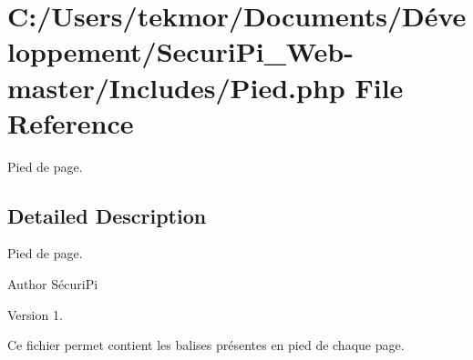 \section{C\+:/\+Users/tekmor/\+Documents/\+Développement/\+Securi\+Pi\+\_\+\+Web-\/master/\+Includes/\+Pied.php File Reference}
\label{_pied_8php}


Pied de page.  




\subsection{Detailed Description}
Pied de page. 

\begin{DoxyAuthor}{Author}
S\'{e}curi\+Pi 
\end{DoxyAuthor}
\begin{DoxyVersion}{Version}
1.
\end{DoxyVersion}
Ce fichier permet contient les balises pr\'{e}sentes en pied de chaque page. 